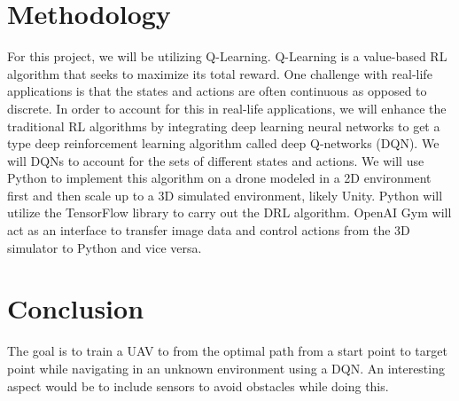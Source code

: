 \documentclass[12pt]{article}
\begin{document}
\section{Methodology}

For this project, we will be utilizing Q-Learning. Q-Learning is a value-based RL algorithm that seeks to maximize its total reward. One challenge with real-life applications is that the states and actions are often continuous as opposed to discrete. In order to account for this in real-life applications, we will enhance the traditional RL algorithms by integrating deep learning neural networks to get a type deep reinforcement learning algorithm called deep Q-networks (DQN). We will DQNs to account for the sets of different states and actions. We will use Python to implement this algorithm on a drone modeled in a 2D environment first and then scale up to a 3D simulated environment, likely Unity. Python will utilize the TensorFlow library to carry out the DRL algorithm. OpenAI Gym will act as an interface to transfer image data and control actions from the 3D simulator to Python and vice versa. 


\section{Conclusion}

The goal is to train a UAV to from the optimal path from a start point to target point while navigating in an unknown environment using a DQN. An interesting aspect would be to include sensors to avoid obstacles while doing this. 


\nocite{Anwar2019}
\nocite{Araar2016}
\nocite{Carrio2017}
\nocite{Madaan}
\nocite{Pham2018}
\nocite{Rodriguez2018}
\nocite{Shin2019}







%
\end{document}
